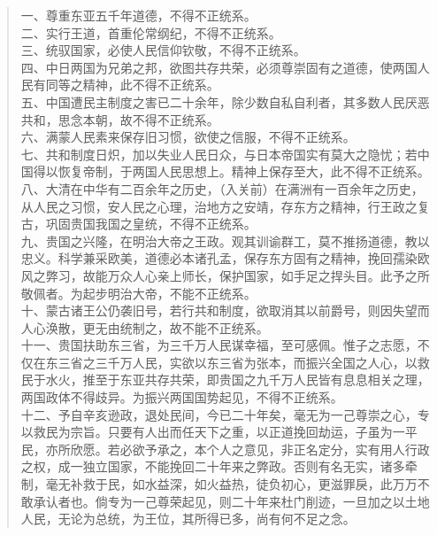 \begin{quote}
	一、尊重东亚五千年道德，不得不正统系。\\

二、实行王道，首重伦常纲纪，不得不正统系。\\

三、统驭国家，必使人民信仰钦敬，不得不正统系。\\

四、中日两国为兄弟之邦，欲图共存共荣，必须尊崇固有之道德，使两国人民有同等之精神，此不得不正统系。\\

五、中国遭民主制度之害已二十余年，除少数自私自利者，其多数人民厌恶共和，思念本朝，故不得不正统系。\\

六、满蒙人民素来保存旧习惯，欲使之信服，不得不正统系。\\

七、共和制度日炽，加以失业人民日众，与日本帝国实有莫大之隐忧；若中国得以恢复帝制，于两国人民思想上。精神上保存至大，此不得不正统系。\\

八、大清在中华有二百余年之历史，（入关前）在满洲有一百余年之历史，从人民之习惯，安人民之心理，治地方之安靖，存东方之精神，行王政之复古，巩固贵国我国之皇统，不得不正统系。\\

九、贵国之兴隆，在明治大帝之王政。观其训谕群工，莫不推扬道德，教以忠义。科学兼采欧美，道德必本诸孔孟，保存东方固有之精神，挽回孺染欧风之弊习，故能万众人心亲上师长，保护国家，如手足之捍头目。此予之所敬佩者。为起步明治大帝，不能不正统系。\\

十、蒙古诸王公仍袭旧号，若行共和制度，欲取消其以前爵号，则因失望而人心涣散，更无由统制之，故不能不正统系。\\

十一、贵国扶助东三省，为三千万人民谋幸福，至可感佩。惟子之志愿，不仅在东三省之三千万人民，实欲以东三省为张本，而振兴全国之人心，以救民于水火，推至于东亚共存共荣，即贵国之九千万人民皆有息息相关之理，两国政体不得歧异。为振兴两国国势起见，不得不正统系。\\

十二、予自辛亥逊政，退处民间，今已二十年矣，毫无为一己尊崇之心，专以救民为宗旨。只要有人出而任天下之重，以正道挽回劫运，子虽为一平民，亦所欣愿。若必欲予承之，本个人之意见，非正名定分，实有用人行政之权，成一独立国家，不能挽回二十年来之弊政。否则有名无实，诸多牵制，毫无补救于民，如水益深，如火益热，徒负初心，更滋罪戾，此万万不敢承认者也。倘专为一己尊荣起见，则二十年来杜门削迹，一旦加之以土地人民，无论为总统，为王位，其所得已多，尚有何不足之念。\\
\end{quote}

